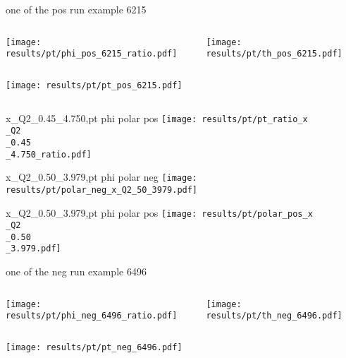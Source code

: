 \begin{frame}{one of the pos run example 6215}
\begin{columns}
\begin{column}[T]{0.5\textwidth}
\texttt{[image: results/pt/phi\_pos\_6215\_ratio.pdf]}
\end{column}
\begin{column}[T]{0.5\textwidth}
\texttt{[image: results/pt/th\_pos\_6215.pdf]}
\end{column}
\end{columns}
\begin{columns}
\begin{column}[T]{0.5\textwidth}
\texttt{[image: results/pt/pt\_pos\_6215.pdf]}
\end{column}
\begin{column}[T]{0.5\textwidth}
\end{column}
\end{columns}
\end{frame}
\begin{frame}{x\_Q2\_0.45\_4.750,pt phi polar pos}
\texttt{[image: results/pt/pt\_ratio\_x\\\_Q2\\\_0.45\\\_4.750\_ratio.pdf]}
\end{frame}
\begin{frame}{x\_Q2\_0.50\_3.979,pt phi polar neg}
\texttt{[image: results/pt/polar\_neg\_x\_Q2\_50\_3979.pdf]}
\end{frame}
\begin{frame}{x\_Q2\_0.50\_3.979,pt phi polar pos}
\texttt{[image: results/pt/polar\_pos\_x\\\_Q2\\\_0.50\\\_3.979.pdf]}
\end{frame}
\begin{frame}{one of the neg run example 6496}
\begin{columns}
\begin{column}[T]{0.5\textwidth}
\texttt{[image: results/pt/phi\_neg\_6496\_ratio.pdf]}
\end{column}
\begin{column}[T]{0.5\textwidth}
\texttt{[image: results/pt/th\_neg\_6496.pdf]}
\end{column}
\end{columns}
\texttt{[image: results/pt/pt\_neg\_6496.pdf]}
\end{frame}
